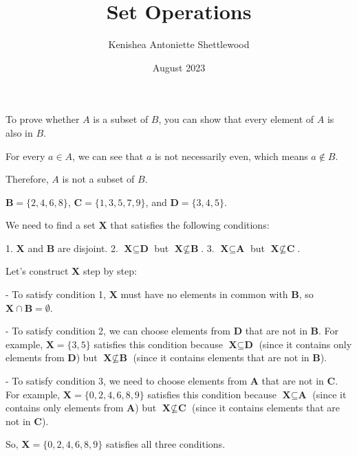 \documentclass{article}
\title{Set Operations}
\author{Kenishea Antoniette Shettlewood}
\date{August 2023}
\begin{document}
\maketitle

To prove whether \(A\) is a subset of \(B\), you can show that every element of \(A\) is also in \(B\).



For every \(a \in A\), we can see that \(a\) is not necessarily even, which means \(a \notin B\).

Therefore, \(A\) is not a subset of \(B\).

\(\textbf{B} = \{2, 4, 6, 8\}\),
\(\textbf{C} = \{1, 3, 5, 7, 9\}\), and
\(\textbf{D} = \{3, 4, 5\}\).

We need to find a set \(\textbf{X}\) that satisfies the following conditions:

1. \(\textbf{X}\) and \(\textbf{B}\) are disjoint.
2. \(\textbf{X} \subseteq \textbf{D}\) but \(\textbf{X} \not\subseteq \textbf{B}\).
3. \(\textbf{X} \subseteq \textbf{A}\) but \(\textbf{X} \not\subseteq \textbf{C}\).

Let's construct \(\textbf{X}\) step by step:

- To satisfy condition 1, \(\textbf{X}\) must have no elements in common with \(\textbf{B}\), so \(\textbf{X} \cap \textbf{B} = \emptyset\).

- To satisfy condition 2, we can choose elements from \(\textbf{D}\) that are not in \(\textbf{B}\). For example, \(\textbf{X} = \{3, 5\}\) satisfies this condition because \(\textbf{X} \subseteq \textbf{D}\) (since it contains only elements from \(\textbf{D}\)) but \(\textbf{X} \not\subseteq \textbf{B}\) (since it contains elements that are not in \(\textbf{B}\)).

- To satisfy condition 3, we need to choose elements from \(\textbf{A}\) that are not in \(\textbf{C}\). For example, \(\textbf{X} = \{0, 2, 4, 6, 8, 9\}\) satisfies this condition because \(\textbf{X} \subseteq \textbf{A}\) (since it contains only elements from \(\textbf{A}\)) but \(\textbf{X} \not\subseteq \textbf{C}\) (since it contains elements that are not in \(\textbf{C}\)).

So, \(\textbf{X} = \{0, 2, 4, 6, 8, 9\}\) satisfies all three conditions.
\end{document}
